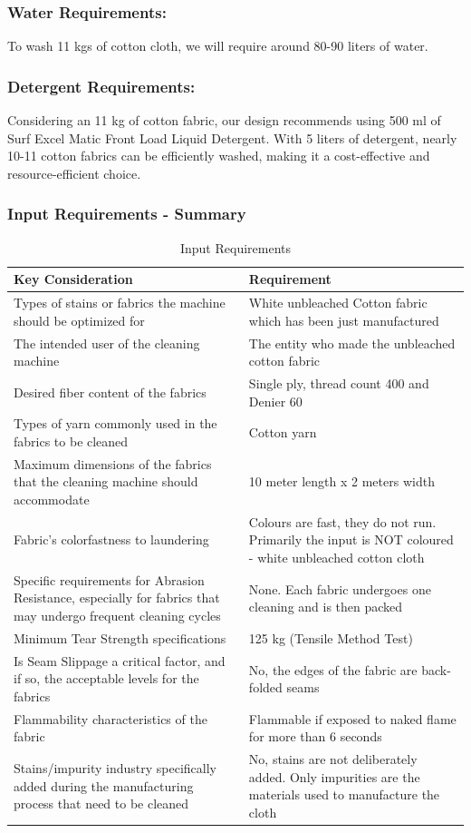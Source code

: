 \documentclass[12pt]{article} %
\begin{document}
   \subsubsection{Water Requirements:} To wash 11 kgs of cotton cloth, we will require around 80-90 liters of water.
   \subsubsection{Detergent Requirements:} Considering an 11 kg of cotton fabric, our design recommends using 500 ml of Surf Excel Matic Front Load Liquid Detergent. With 5 liters of detergent, nearly 10-11 cotton fabrics can be efficiently washed, making it a cost-effective and resource-efficient choice.

\subsubsection{Input Requirements - Summary}
\begin{table}[h]
\centering
\begin{tabular}{ |p{7.5cm}|p{7.5cm}| }

\hline
\textbf{Key Consideration} & \textbf{Requirement} \\
\hline
Types of stains or fabrics the machine should be optimized for & White unbleached Cotton fabric which has been just manufactured \\
\hline
The intended user of the cleaning machine & The entity who made the unbleached cotton fabric \\
\hline
Desired fiber content of the fabrics & Single ply, \gls{thread count} 400 and \gls{Denier} 60 \\
\hline
Types of yarn commonly used in the fabrics to be cleaned & Cotton yarn \\
\hline
Maximum dimensions of the fabrics that the cleaning machine should accommodate & 10 meter length x 2 meters width \\
\hline
Fabric's colorfastness\index{colorfastness} to laundering & Colours are fast, they do not run. Primarily the input is NOT coloured - white unbleached cotton cloth \\
\hline
Specific requirements for \gls{Abrasion Resistance}, especially for fabrics that may undergo frequent cleaning cycles & None. Each fabric undergoes one cleaning and is then packed \\
\hline
Minimum \gls{Tear Strength} specifications & 125 kg (\gls{Tensile Method Test}) \\
\hline
Is \gls{Seam Slippage} a critical factor, and if so, the acceptable levels for the fabrics & No, the edges of the fabric are \gls{back-folded seams} \\
\hline
Flammability\index{flammability} characteristics of the fabric & Flammable if exposed to naked flame for more than 6 seconds\\
\hline
Stains/impurity industry specifically added during the manufacturing process that need to be cleaned & No, stains are not deliberately added. Only impurities are the materials used to manufacture the cloth \\
\hline
\end{tabular}
\caption{Input Requirements}
\label{table:your_label}
\end{table}
\end{document}
